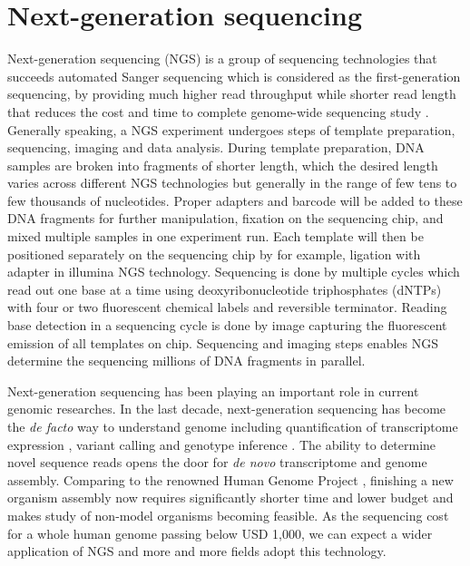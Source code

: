 \section{Next-generation sequencing}
\label{s:ngs}

Next-generation sequencing (NGS) is a group of sequencing technologies that
succeeds automated Sanger sequencing which is considered as the first-generation
sequencing, by providing much higher read throughput while shorter read length
that reduces the cost and time to complete genome-wide sequencing study
\cite{metzker2010:sequencing}. Generally speaking, a NGS experiment undergoes
steps of template preparation, sequencing, imaging and data analysis. During
template preparation, DNA samples are broken into fragments of shorter length,
which the desired length varies across different NGS technologies but generally
in the range of few tens to few thousands of nucleotides. Proper adapters and
barcode will be added to these DNA fragments for further manipulation, fixation
on the sequencing chip, and mixed multiple samples in one experiment run. Each
template will then be positioned separately on the sequencing chip by for
example, ligation with adapter in illumina NGS technology. Sequencing is done
by multiple cycles which read out one base at a time using deoxyribonucleotide
triphosphates (dNTPs) with four or two fluorescent chemical labels and
reversible terminator. Reading base detection in a sequencing cycle is done by
image capturing the fluorescent emission of all templates on chip. Sequencing
and imaging steps enables NGS determine the sequencing millions of DNA
fragments in parallel.

Next-generation sequencing has been playing an important role in current
genomic researches. In the last decade, next-generation sequencing has become
the \textit{de facto} way to understand genome \cite{vandijk2014:ten} including
quantification of transcriptome expression \cite{wang2009:rnaseq}, variant
calling and genotype inference \cite{nielsen2011:genotype}. The ability to
determine novel sequence reads opens the door for \textit{de novo}
transcriptome and genome assembly. Comparing to the renowned Human Genome
Project \cite{lander2001:initial}, finishing a new organism assembly now
requires significantly shorter time and lower budget and makes study of
non-model organisms becoming feasible. As the sequencing cost for a whole human
genome passing below USD 1,000, we can expect a wider application of NGS and
more and more fields adopt this technology.

